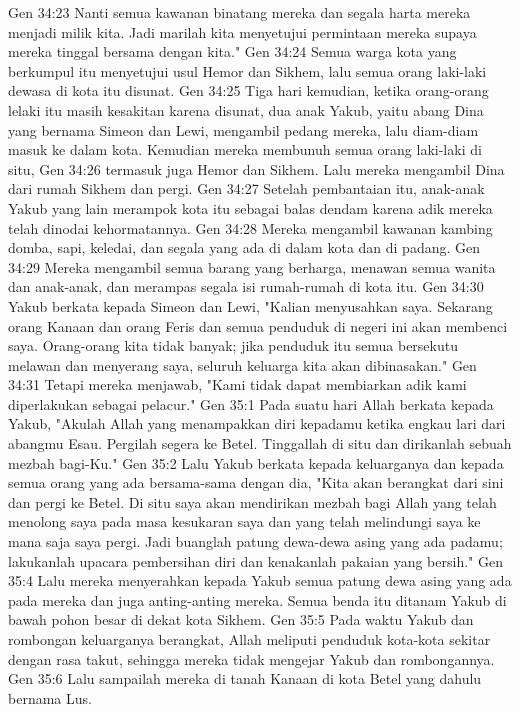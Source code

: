 Gen 34:23  Nanti semua kawanan binatang mereka dan segala harta mereka menjadi milik kita. Jadi marilah kita menyetujui permintaan mereka supaya mereka tinggal bersama dengan kita."
Gen 34:24  Semua warga kota yang berkumpul itu menyetujui usul Hemor dan Sikhem, lalu semua orang laki-laki dewasa di kota itu disunat.
Gen 34:25  Tiga hari kemudian, ketika orang-orang lelaki itu masih kesakitan karena disunat, dua anak Yakub, yaitu abang Dina yang bernama Simeon dan Lewi, mengambil pedang mereka, lalu diam-diam masuk ke dalam kota. Kemudian mereka membunuh semua orang laki-laki di situ,
Gen 34:26  termasuk juga Hemor dan Sikhem. Lalu mereka mengambil Dina dari rumah Sikhem dan pergi.
Gen 34:27  Setelah pembantaian itu, anak-anak Yakub yang lain merampok kota itu sebagai balas dendam karena adik mereka telah dinodai kehormatannya.
Gen 34:28  Mereka mengambil kawanan kambing domba, sapi, keledai, dan segala yang ada di dalam kota dan di padang.
Gen 34:29  Mereka mengambil semua barang yang berharga, menawan semua wanita dan anak-anak, dan merampas segala isi rumah-rumah di kota itu.
Gen 34:30  Yakub berkata kepada Simeon dan Lewi, "Kalian menyusahkan saya. Sekarang orang Kanaan dan orang Feris dan semua penduduk di negeri ini akan membenci saya. Orang-orang kita tidak banyak; jika penduduk itu semua bersekutu melawan dan menyerang saya, seluruh keluarga kita akan dibinasakan."
Gen 34:31  Tetapi mereka menjawab, "Kami tidak dapat membiarkan adik kami diperlakukan sebagai pelacur."
Gen 35:1  Pada suatu hari Allah berkata kepada Yakub, "Akulah Allah yang menampakkan diri kepadamu ketika engkau lari dari abangmu Esau. Pergilah segera ke Betel. Tinggallah di situ dan dirikanlah sebuah mezbah bagi-Ku."
Gen 35:2  Lalu Yakub berkata kepada keluarganya dan kepada semua orang yang ada bersama-sama dengan dia, "Kita akan berangkat dari sini dan pergi ke Betel. Di situ saya akan mendirikan mezbah bagi Allah yang telah menolong saya pada masa kesukaran saya dan yang telah melindungi saya ke mana saja saya pergi. Jadi buanglah patung dewa-dewa asing yang ada padamu; lakukanlah upacara pembersihan diri dan kenakanlah pakaian yang bersih."
Gen 35:4  Lalu mereka menyerahkan kepada Yakub semua patung dewa asing yang ada pada mereka dan juga anting-anting mereka. Semua benda itu ditanam Yakub di bawah pohon besar di dekat kota Sikhem.
Gen 35:5  Pada waktu Yakub dan rombongan keluarganya berangkat, Allah meliputi penduduk kota-kota sekitar dengan rasa takut, sehingga mereka tidak mengejar Yakub dan rombongannya.
Gen 35:6  Lalu sampailah mereka di tanah Kanaan di kota Betel yang dahulu bernama Lus.
